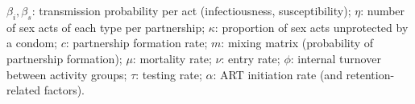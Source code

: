 $\beta_i, \beta_s$: transmission probability per act (infectiousness, susceptibility);
$\eta$:      number of sex acts of each type per partnership;
$\kappa$:    proportion of sex acts unprotected by a condom;
$c$:         partnership formation rate;
$m$:         mixing matrix (probability of partnership formation);
$\mu$:       mortality rate;
$\nu$:       entry rate;
$\phi$:      internal turnover between activity groups;
$\tau$:      testing rate;
$\alpha$:    ART initiation rate (and retention-related factors).